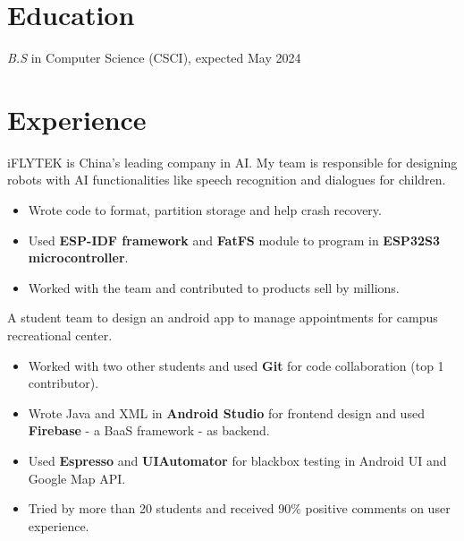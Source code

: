 \documentclass{resume}
\begin{document}



\section{Education}
\textit{B.S} in Computer Science (CSCI), expected May 2024

\section{Experience}
  iFLYTEK is China's leading company in AI. My team is responsible for designing robots with AI functionalities like speech recognition and dialogues for children.
\begin{itemize}
  \item Wrote code to format, partition storage and help crash recovery.
  \item Used \textbf{ESP-IDF framework} and \textbf{FatFS} module to program in \textbf{ESP32S3 microcontroller}.
  \item Worked with the team and contributed to products sell by millions.
\end{itemize}

  A student team to design an android app to manage appointments for campus recreational center.
\begin{itemize}
  \item Worked with two other students and used \textbf{Git} for code collaboration (top 1 contributor).
  \item Wrote Java and XML in \textbf{Android Studio} for frontend design and used \textbf{Firebase} - a BaaS framework - as backend.
  \item Used \textbf{Espresso} and \textbf{UIAutomator} for blackbox testing in Android UI and Google Map API.
  \item Tried by more than 20 students and received 90\% positive comments on user experience.
\end{itemize}
\end{document}
